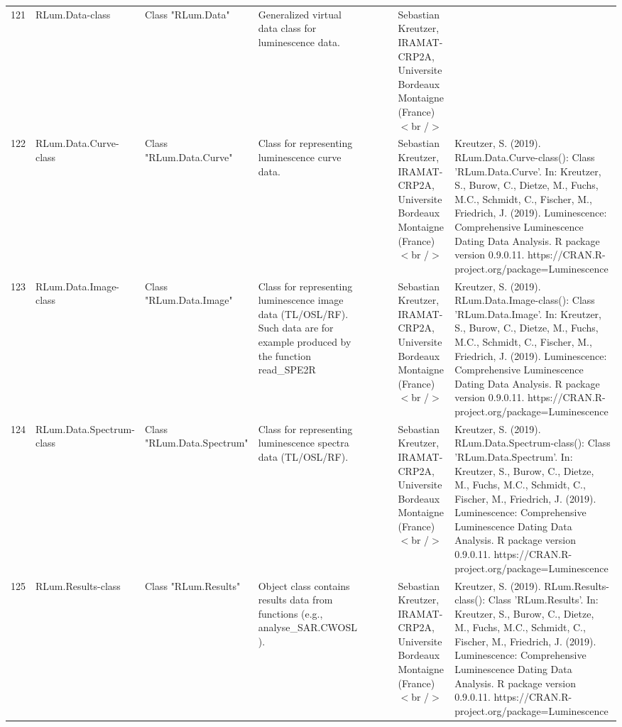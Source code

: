 \begin{table}[ht]
\begin{tabular}{rllllllll}
 \\ 
  121 & RLum.Data-class & Class  "RLum.Data" & Generalized virtual data class for luminescence data. &  &  &  & Sebastian Kreutzer, IRAMAT-CRP2A, Universite Bordeaux Montaigne (France)$<$br /$>$ &  \\ 
  122 & RLum.Data.Curve-class & Class  "RLum.Data.Curve" & Class for representing luminescence curve data. &  &  &  & Sebastian Kreutzer, IRAMAT-CRP2A, Universite Bordeaux Montaigne (France)$<$br /$>$ & Kreutzer, S. (2019). RLum.Data.Curve-class(): Class 'RLum.Data.Curve'. In: Kreutzer, S., Burow, C., Dietze, M., Fuchs, M.C., Schmidt, C., Fischer, M., Friedrich, J. (2019). Luminescence: Comprehensive Luminescence Dating Data Analysis. R package version 0.9.0.11. https://CRAN.R-project.org/package=Luminescence
 \\ 
  123 & RLum.Data.Image-class & Class  "RLum.Data.Image" & Class for representing luminescence image data (TL/OSL/RF). Such data are for example produced by the function  read\_SPE2R &  &  &  & Sebastian Kreutzer, IRAMAT-CRP2A, Universite Bordeaux Montaigne (France)$<$br /$>$ & Kreutzer, S. (2019). RLum.Data.Image-class(): Class 'RLum.Data.Image'. In: Kreutzer, S., Burow, C., Dietze, M., Fuchs, M.C., Schmidt, C., Fischer, M., Friedrich, J. (2019). Luminescence: Comprehensive Luminescence Dating Data Analysis. R package version 0.9.0.11. https://CRAN.R-project.org/package=Luminescence
 \\ 
  124 & RLum.Data.Spectrum-class & Class  "RLum.Data.Spectrum" & Class for representing luminescence spectra data (TL/OSL/RF). &  &  &  & Sebastian Kreutzer, IRAMAT-CRP2A, Universite Bordeaux Montaigne (France)$<$br /$>$ & Kreutzer, S. (2019). RLum.Data.Spectrum-class(): Class 'RLum.Data.Spectrum'. In: Kreutzer, S., Burow, C., Dietze, M., Fuchs, M.C., Schmidt, C., Fischer, M., Friedrich, J. (2019). Luminescence: Comprehensive Luminescence Dating Data Analysis. R package version 0.9.0.11. https://CRAN.R-project.org/package=Luminescence
 \\ 
  125 & RLum.Results-class & Class  "RLum.Results" & Object class contains results data from functions (e.g.,  analyse\_SAR.CWOSL ). &  &  &  & Sebastian Kreutzer, IRAMAT-CRP2A, Universite Bordeaux Montaigne (France)$<$br /$>$ & Kreutzer, S. (2019). RLum.Results-class(): Class 'RLum.Results'. In: Kreutzer, S., Burow, C., Dietze, M., Fuchs, M.C., Schmidt, C., Fischer, M., Friedrich, J. (2019). Luminescence: Comprehensive Luminescence Dating Data Analysis. R package version 0.9.0.11. https://CRAN.R-project.org/package=Luminescence

\end{tabular}
\end{table}
